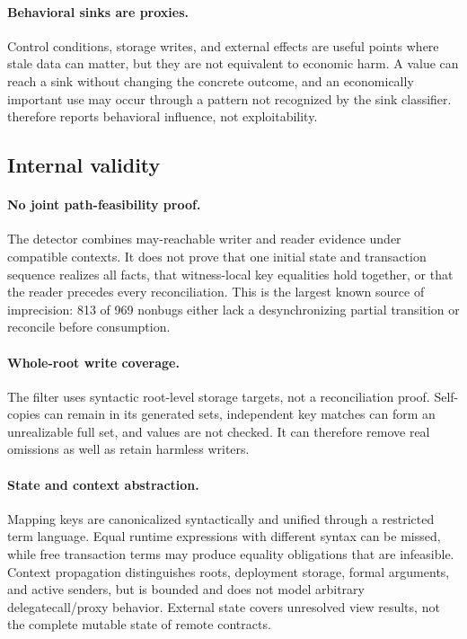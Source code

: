\paragraph{Behavioral sinks are proxies.}
Control conditions, storage writes, and external effects are useful points where stale data can matter, but they are not equivalent to economic harm. A value can reach a sink without changing the concrete outcome, and an economically important use may occur through a pattern not recognized by the sink classifier. \sys therefore reports behavioral influence, not exploitability.

\subsection{Internal validity}
\label{s:limitations-internal}

\paragraph{No joint path-feasibility proof.}
The detector combines may-reachable writer and reader evidence under compatible contexts. It does not prove that one initial state and transaction sequence realizes all facts, that witness-local key equalities hold together, or that the reader precedes every reconciliation. This is the largest known source of imprecision: 813 of 969 nonbugs either lack a desynchronizing partial transition or reconcile before consumption.

\paragraph{Whole-root write coverage.}
The filter uses syntactic root-level storage targets, not a reconciliation proof. Self-copies can remain in its generated sets, independent key matches can form an unrealizable full set, and values are not checked. It can therefore remove real omissions as well as retain harmless writers.

\paragraph{State and context abstraction.}
Mapping keys are canonicalized syntactically and unified through a restricted term language. Equal runtime expressions with different syntax can be missed, while free transaction terms may produce equality obligations that are infeasible. Context propagation distinguishes roots, deployment storage, formal arguments, and active senders, but is bounded and does not model arbitrary delegatecall/proxy behavior. External state covers unresolved view results, not the complete mutable state of remote contracts.

